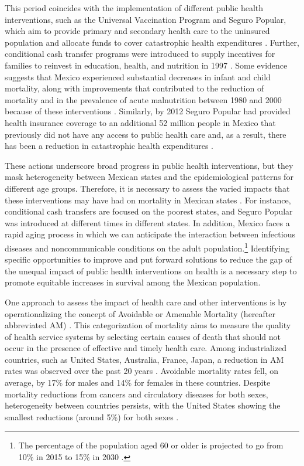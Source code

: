 \documentclass{bmcart}
\begin{document}
This
period coincides with the implementation of different public health
interventions, such as the Universal Vaccination Program and Seguro
Popular, which aim to provide primary and secondary
health care to the uninsured population and allocate funds to cover catastrophic
health expenditures \cite{knaul2005}. Further, conditional cash transfer programs were introduced to supply incentives for families to reinvest in education, health, and nutrition in 1997 \cite{neufeld2012}. Some evidence
suggests that Mexico experienced substantial decreases in infant and child
mortality, along with improvements that contributed to the reduction of
mortality and in the prevalence of acute malnutrition between 1980 and 2000
because of these interventions \cite{sepulveda2006}. Similarly, by 2012 Seguro Popular had provided health insurance coverage to an additional 52 million
people in Mexico that previously did not have any access to public health care and, as a result, there has been a reduction in catastrophic health expenditures \cite{knaul2012}.

These actions underscore broad progress in public health interventions, but they mask heterogeneity between Mexican states and the epidemiological patterns for different age groups. Therefore, it is necessary to assess the varied impacts that these interventions may have had on mortality in Mexican states \cite{urquieta2015evolution}. For instance, conditional cash transfers are focused on the poorest states, and Seguro Popular was introduced at different times in different states. In addition, Mexico faces a rapid aging process in which we can anticipate the interaction between infectious diseases and noncommunicable conditions \cite{Bygbjerg1499} on the adult population.\footnote{The percentage of the population aged 60 or older is projected to go from 10\% in 2015 to 15\% in 2030 \cite{CONAPO}.} Identifying specific opportunities to improve and put forward solutions to reduce the gap of  the unequal impact of public health interventions on health is a necessary step to promote equitable increases in survival among the Mexican population.%
 
 One approach to assess the impact of health care and other interventions is by operationalizing the
 concept of Avoidable or Amenable Mortality (hereafter abbreviated AM)
 \cite{nolte&mckee2004, nolte&mckee2008,elo2014}. This categorization of mortality aims to measure the quality of health service systems by selecting certain
 causes of death that should not occur in the presence of effective and
 timely health care. Among industrialized countries, such as United States,
 Australia, France, Japan, a reduction in AM rates was
 observed over the past 20 years
 \cite{nolte&mckee2008}. Avoidable mortality rates fell, on average, by 17\%
 for males and 14\% for females in these countries. Despite mortality reductions from cancers and circulatory diseases for
 both sexes, heterogeneity between countries persists, with the United
 States showing the smallest reductions (around 5\%) for both sexes  \cite{nolte&mckee2008}. 
 
\end{document}
